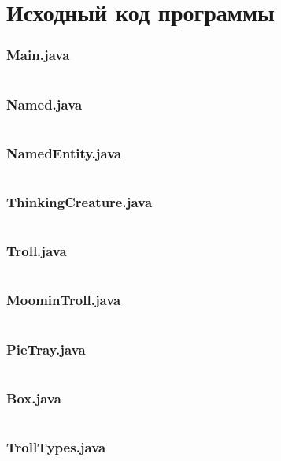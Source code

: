 \documentclass[11pt]{article}
\begin{document}
\section{Исходный код программы}
\small
\subsubsection{Main.java}
\inputminted{java}{../prog3lab/src/main/java/com/kupp/prog3lab/Main.java}
\subsubsection{Named.java}
\inputminted{java}{../prog3lab/src/main/java/com/kupp/prog3lab/Named.java}
\subsubsection{NamedEntity.java}
\inputminted{java}{../prog3lab/src/main/java/com/kupp/prog3lab/NamedEntity.java}
\subsubsection{ThinkingCreature.java}
\inputminted{java}{../prog3lab/src/main/java/com/kupp/prog3lab/ThinkingCreature.java}
\subsubsection{Troll.java}
\inputminted{java}{../prog3lab/src/main/java/com/kupp/prog3lab/Troll.java}
\subsubsection{MoominTroll.java}
\inputminted{java}{../prog3lab/src/main/java/com/kupp/prog3lab/MoominTroll.java}
\subsubsection{PieTray.java}
\inputminted{java}{../prog3lab/src/main/java/com/kupp/prog3lab/PieTray.java}
\subsubsection{Box.java}
\inputminted{java}{../prog3lab/src/main/java/com/kupp/prog3lab/Box.java}
\subsubsection{TrollTypes.java}
\inputminted{java}{../prog3lab/src/main/java/com/kupp/prog3lab/TrollTypes.java}
\end{document}
